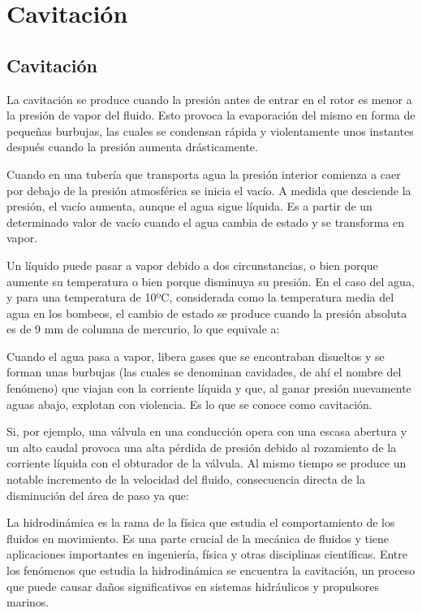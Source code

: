\documentclass[../main]{subfiles}
\begin{document}
\chapter{Cavitación}


\section{Cavitación}
La cavitación se produce cuando la presión antes de entrar en el rotor es menor a la presión de vapor del fluido. Esto provoca la evaporación del mismo en forma de pequeñas burbujas, las cuales se condensan rápida y violentamente unos instantes después cuando la presión aumenta drásticamente.


Cuando en una tubería que transporta agua la presión interior comienza a caer por debajo de la presión atmosférica se inicia el vacío. A medida que desciende la presión, el vacío aumenta, aunque el agua sigue líquida. Es a partir de un determinado valor de vacío cuando el agua cambia de estado y se transforma en vapor.

Un líquido puede pasar a vapor debido a dos circunstancias, o bien porque aumente su temperatura o bien porque disminuya su presión. En el caso del agua, y para una temperatura de 10ºC, considerada como la temperatura media del agua en los bombeos, el cambio de estado se produce cuando la presión absoluta es de 9 mm de columna de mercurio, lo que equivale a:

Cuando el agua pasa a vapor, libera gases que se encontraban disueltos y se forman unas burbujas (las cuales se denominan cavidades, de ahí el nombre del fenómeno) que viajan con la corriente líquida y que, al ganar presión nuevamente aguas abajo, explotan con violencia. Es lo que se conoce como cavitación.

Si, por ejemplo, una válvula en una conducción opera con una escasa abertura y un alto caudal provoca una alta pérdida de presión debido al rozamiento de la corriente líquida con el obturador de la válvula. Al mismo tiempo se produce un notable incremento de la velocidad del fluido, consecuencia directa de la disminución del área de paso ya que:


La hidrodinámica es la rama de la física que estudia el comportamiento de los fluidos en movimiento. Es una parte crucial de la mecánica de fluidos y tiene aplicaciones importantes en ingeniería, física y otras disciplinas científicas. Entre los fenómenos que estudia la hidrodinámica se encuentra la cavitación, un proceso que puede causar daños significativos en sistemas hidráulicos y propulsores marinos.
\end{document}
